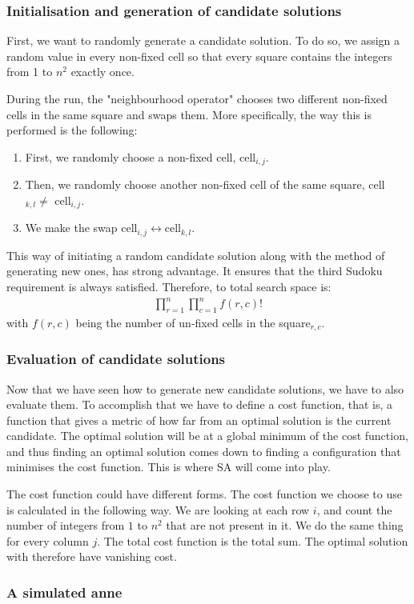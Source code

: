 \documentclass[11pt]{report}
\begin{document}
\subsubsection{Initialisation and generation of candidate solutions}


First, we want to randomly generate a candidate solution. To do so, we assign a random value in every non-fixed cell so that every square contains the integers from 1 to $n^2$ exactly once.

During the run, the "neighbourhood operator" chooses two different non-fixed cells in the same square and swaps them. More specifically, the way this is performed is the following:
\begin{enumerate}
	\item First, we randomly choose a non-fixed cell, cell$_{i,j}$.
	\item Then, we randomly choose another non-fixed cell of the same square, cell$_{k,l}\neq$ cell$_{i,j}$.
	\item We make the swap $\text{cell}_{i,j} \leftrightarrow \text{cell}_{k,l}$.
\end{enumerate}

This way of initiating a random candidate solution along with the method of generating new ones, has strong advantage. It ensures that the third Sudoku requirement is always satisfied. Therefore, to total search space is:
\begin{align}
	\prod_{r=1}^n\prod_{c=1}^nf(r,c)!
\end{align}
with $f(r,c)$ being the number of un-fixed cells in the square$_{r,c}$.


\subsubsection{Evaluation of candidate solutions}

Now that we have seen how to generate new candidate solutions, we have to also evaluate them. To accomplish that we have to define a cost function, that is, a function that gives a metric of how far from an optimal solution is the current candidate. The optimal solution will be at a global minimum of the cost function, and thus finding an optimal solution comes down to finding a configuration that minimises the cost function. This is where SA will come into play.

The cost function could have different forms. The cost function we choose to use is calculated in the following way. We are looking at each row $i$, and count the number of integers from $1 $ to $n^2$ that are not present in it. We do the same thing for every column $j$. The total cost function is the total sum. The optimal solution with therefore have vanishing cost.


\subsubsection{A simulated anne}
\end{document}
